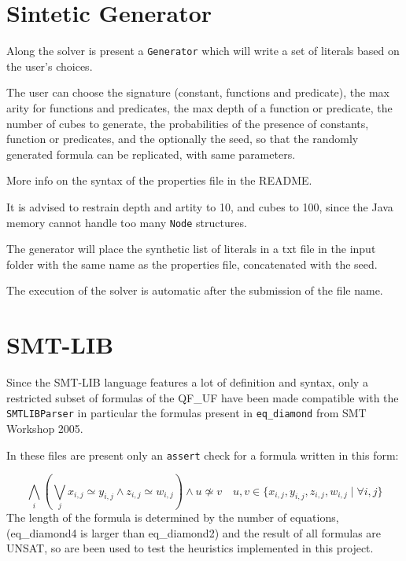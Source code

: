 \documentclass[11pt,a4paper]{article}
\begin{document}
    \section{Sintetic Generator}

    Along the solver is present a \texttt{Generator} which will write a set of literals based on the user's choices.

    The user can choose the signature (constant, functions and predicate), the max arity for functions and predicates, the max depth of a function or predicate, the number of cubes to generate, the probabilities of the presence of constants, function or predicates, and the optionally the seed, so that the randomly generated formula can be replicated, with same parameters.

    More info on the syntax of the properties file in the README.

    It is advised to restrain depth and artity to 10, and cubes to 100, since the Java memory cannot handle too many \texttt{Node} structures.

    The generator will place the synthetic list of literals in a txt file in the input folder with the same name as the properties file, concatenated with the seed. 

    The execution of the solver is automatic after the submission of the file name.

    \section{SMT-LIB}

    Since the SMT-LIB language features a lot of definition and syntax, only a restricted subset of formulas of the QF\_UF have been made compatible with the \texttt{SMTLIBParser} in particular the formulas present in \texttt{eq\_diamond} from SMT Workshop 2005.

    In these files are present only an \texttt{assert} check for a formula written in this form:

    \begin{equation}
        \bigwedge_i \left(\bigvee_j x_{i,j} \simeq y_{i,j} \land z_{i,j} \simeq w_{i,j} \right) 
        \land u \not\simeq v \quad u,v \in \{x_{i,j}, y_{i,j}, z_{i,j}, w_{i,j} \mid \forall i,j\}
    \end{equation} 
    The length of the formula is determined by the number of equations, (eq\_diamond4 is larger than eq\_diamond2) and the result of all formulas are UNSAT, so are been used to test the heuristics implemented in this project.
\end{document}
